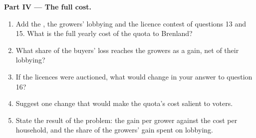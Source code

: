 \begin{problem}
\medskip
\noindent\textbf{Part IV --- The full cost.}
\begin{enumerate}[resume]
\item Add the , the growers' lobbying and the licence contest of questions 13 and 15. What is the full yearly cost of the quota to Brenland?
\item What share of the buyers' loss reaches the growers as a gain, net of their lobbying?
\item If the licences were auctioned, what would change in your answer to question 16?
\item Suggest one change that would make the quota's cost salient to voters.
\item State the result of the problem: the gain per grower against the cost per household, and the share of the growers' gain spent on lobbying.
\end{enumerate}
\end{problem}
